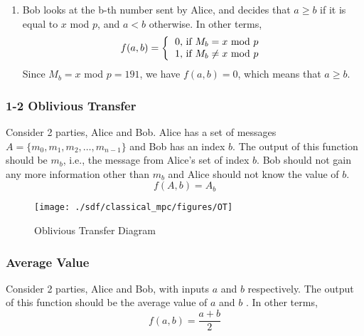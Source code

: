 \begin{refsection}
\begin{enumerate}
\item Bob looks at the b-th number sent by Alice, and decides that $a \geq b$ if it is equal to $x$ mod $p$,
and $a < b$ otherwise. In other terms,
\[
f(a,b) = \left \{
          \begin{tabular}{ccc}
          0, if $M_b = x$ mod $p$ \\
          1, if $M_b \ne x$ mod $p$
          \end{tabular}
        \right.
\]
Since $M_b = x$ mod $p = 191$, we have $f(a,b) = 0$, which means that $a \geq b$.
\end{enumerate}

\subsubsection{1-2 Oblivious Transfer}
Consider 2 parties, Alice and Bob. Alice has a set of messages $A=\{m_0,m_1,m_2,\ldots,m_{n-1}\}$
and Bob has an index $b$. The output of this function should be $m_b$, i.e., the message from Alice's set of index $b$. Bob should not gain any more information other than $m_b$ and Alice should not know the value of $b$.
\begin{equation}\label{eq:messageaccess}
f(A,b) = A_b
\end{equation}

\renewcommand{\figurename}{Figure}
\begin{figure}[H]
\centering
\texttt{[image: ./sdf/classical\_mpc/figures/OT]}
\caption{Oblivious Transfer Diagram}
\label{fig:otscheme}
\end{figure}





\subsubsection{Average Value}
Consider 2 parties, Alice and Bob, with inputs $a$ and $b$ respectively. The output of this function should be the average value of $a$ and $b$
. In other terms,
\begin{equation}\label{eq:tpc}
f(a,b) = \frac{a+b}{2}
\end{equation}


\end{refsection}
